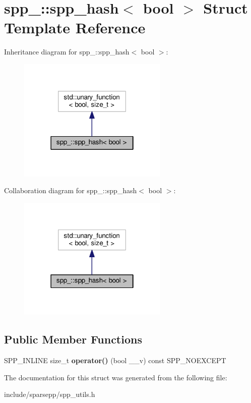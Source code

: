 \hypertarget{structspp___1_1spp__hash_3_01bool_01_4}{}\section{spp\+\_\+\+:\+:spp\+\_\+hash$<$ bool $>$ Struct Template Reference}
\label{structspp___1_1spp__hash_3_01bool_01_4}


Inheritance diagram for spp\+\_\+\+:\+:spp\+\_\+hash$<$ bool $>$\+:\nopagebreak
\begin{figure}[H]
\begin{center}
\leavevmode
\includegraphics[width=202pt]{structspp___1_1spp__hash_3_01bool_01_4__inherit__graph}
\end{center}
\end{figure}


Collaboration diagram for spp\+\_\+\+:\+:spp\+\_\+hash$<$ bool $>$\+:\nopagebreak
\begin{figure}[H]
\begin{center}
\leavevmode
\includegraphics[width=202pt]{structspp___1_1spp__hash_3_01bool_01_4__coll__graph}
\end{center}
\end{figure}
\subsection*{Public Member Functions}
\begin{DoxyCompactItemize}
\item 
S\+P\+P\+\_\+\+I\+N\+L\+I\+NE size\+\_\+t {\bfseries operator()} (bool \+\_\+\+\_\+v) const S\+P\+P\+\_\+\+N\+O\+E\+X\+C\+E\+PT\hypertarget{structspp___1_1spp__hash_3_01bool_01_4_aff4bc2263c8c8dd02e76380d61cfdc84}{}\label{structspp___1_1spp__hash_3_01bool_01_4_aff4bc2263c8c8dd02e76380d61cfdc84}

\end{DoxyCompactItemize}


The documentation for this struct was generated from the following file\+:\begin{DoxyCompactItemize}
\item 
include/sparsepp/spp\+\_\+utils.\+h\end{DoxyCompactItemize}
